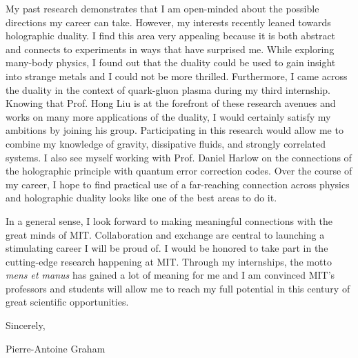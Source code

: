\documentclass[12pt]{article}
\begin{document}
My past research demonstrates that I am open-minded about the possible directions my career can take. However, my interests recently leaned towards holographic duality. I find this area very appealing because it is both abstract and connects to experiments in ways that have surprised me. While exploring many-body physics, I found out that the duality could be used to gain insight into strange metals and I could not be more thrilled. Furthermore, I came across the duality in the context of quark-gluon plasma during my third internship. Knowing that Prof. Hong Liu is at the forefront of these research avenues and works on many more applications of the duality, I would certainly satisfy my ambitions by joining his group. Participating in this research would allow me to combine my knowledge of gravity, dissipative fluids, and strongly correlated systems. I also see myself working with Prof. Daniel Harlow on the connections of the holographic principle with quantum error correction codes. Over the course of my career, I hope to find practical use of a far-reaching connection across physics and holographic duality looks like one of the best areas to do it. \vspace{0.4cm}

In a general sense, I look forward to making meaningful connections with the great minds of MIT. Collaboration and exchange are central to launching a stimulating career I will be proud of. I would be honored to take part in the cutting-edge research happening at MIT. Through my internships, the motto \textit{mens et manus} has gained a lot of meaning for me and I am convinced MIT's professors and students will allow me to reach my full potential in this century of great scientific opportunities.
\vspace{0.4cm}

Sincerely,

\vspace{0.4cm}
Pierre-Antoine Graham
\end{document}
